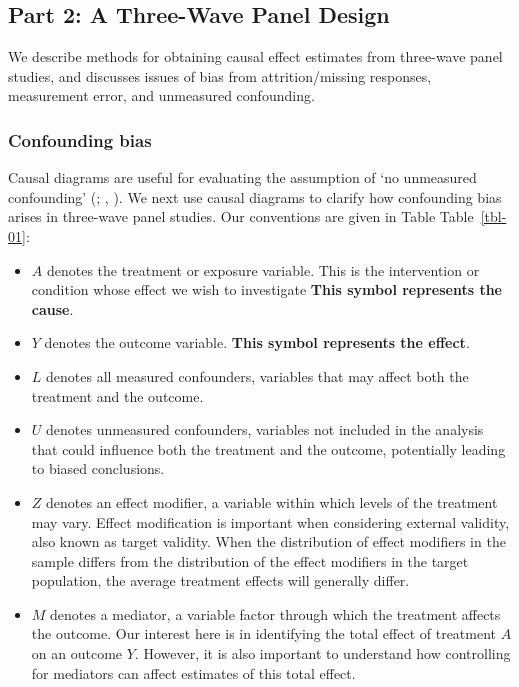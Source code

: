 \documentclass[
  singlecolumn]{article}
\providecommand{\tightlist}{%
  \setlength{\itemsep}{0pt}\setlength{\parskip}{0pt}}\usepackage{longtable,booktabs,array}
\begin{document}
\newpage{}

\subsection{Part 2: A Three-Wave Panel
Design}\label{part-2-a-three-wave-panel-design}

We describe methods for obtaining causal effect estimates from
three-wave panel studies, and discusses issues of bias from
attrition/missing responses, measurement error, and unmeasured
confounding.

\subsubsection{Confounding bias}\label{confounding-bias}

Causal diagrams are useful for evaluating the assumption of `no
unmeasured confounding' (; ,
). We next use causal diagrams to clarify
how confounding bias arises in three-wave panel studies. Our conventions
are given in Table Table~\ref{tbl-01}:

\begin{itemize}
\tightlist
\item
  \textbf{\(A\)} denotes the treatment or exposure variable. This is the
  intervention or condition whose effect we wish to investigate
  \textbf{This symbol represents the cause}.
\item
  \textbf{\(Y\)} denotes the outcome variable. \textbf{This symbol
  represents the effect}.
\item
  \textbf{\(L\)} denotes all measured confounders, variables that may
  affect both the treatment and the outcome.
\item
  \textbf{\(U\)} denotes unmeasured confounders, variables not included
  in the analysis that could influence both the treatment and the
  outcome, potentially leading to biased conclusions.
\item
  \textbf{\(Z\)} denotes an effect modifier, a variable within which
  levels of the treatment may vary. Effect modification is important
  when considering external validity, also known as target validity.
  When the distribution of effect modifiers in the sample differs from
  the distribution of the effect modifiers in the target population, the
  average treatment effects will generally differ.
\item
  \textbf{\(M\)} denotes a mediator, a variable factor through which the
  treatment affects the outcome. Our interest here is in identifying the
  total effect of treatment \(A\) on an outcome \(Y\). However, it is
  also important to understand how controlling for mediators can affect
  estimates of this total effect.
\end{itemize}
\end{document}
